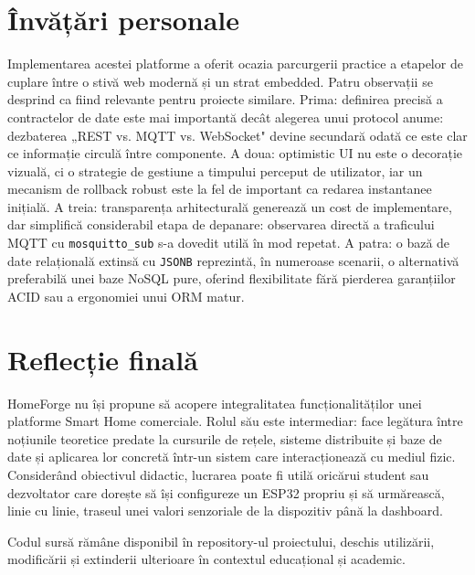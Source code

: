 \section*{Învățări personale}
Implementarea acestei platforme a oferit ocazia parcurgerii practice a etapelor de cuplare între o stivă web modernă și un strat embedded. Patru observații se desprind ca fiind relevante pentru proiecte similare. Prima: definirea precisă a contractelor de date este mai importantă decât alegerea unui protocol anume: dezbaterea „REST vs. MQTT vs. WebSocket" devine secundară odată ce este clar ce informație circulă între componente. A doua: optimistic UI nu este o decorație vizuală, ci o strategie de gestiune a timpului perceput de utilizator, iar un mecanism de rollback robust este la fel de important ca redarea instantanee inițială. A treia: transparența arhitecturală generează un cost de implementare, dar simplifică considerabil etapa de depanare: observarea directă a traficului MQTT cu \texttt{mosquitto\_sub} s-a dovedit utilă în mod repetat. A patra: o bază de date relațională extinsă cu \texttt{JSONB} reprezintă, în numeroase scenarii, o alternativă preferabilă unei baze NoSQL pure, oferind flexibilitate fără pierderea garanțiilor ACID sau a ergonomiei unui ORM matur.

\section*{Reflecție finală}
HomeForge nu își propune să acopere integralitatea funcționalităților unei platforme Smart Home comerciale. Rolul său este intermediar: face legătura între noțiunile teoretice predate la cursurile de rețele, sisteme distribuite și baze de date și aplicarea lor concretă într-un sistem care interacționează cu mediul fizic. Considerând obiectivul didactic, lucrarea poate fi utilă oricărui student sau dezvoltator care dorește să își configureze un ESP32 propriu și să urmărească, linie cu linie, traseul unei valori senzoriale de la dispozitiv până la dashboard.

Codul sursă rămâne disponibil în repository-ul proiectului, deschis utilizării, modificării și extinderii ulterioare în contextul educațional și academic.
